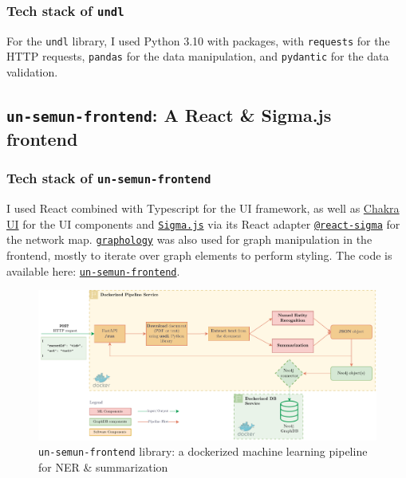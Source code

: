 \documentclass[11pt]{article}
\begin{document}
\subsubsection*{Tech stack of \texttt{undl}} \label{sssec:tech-stack-of-undl}

For the \texttt{undl} library, I used Python 3.10 with packages, with \texttt{requests} for the HTTP requests, \texttt{pandas} for the data manipulation, and \texttt{pydantic} for the data validation.

\subsection{\texttt{un-semun-frontend}: A React \& Sigma.js frontend} \label{ssec:un-semun-frontend-a-react-sigma-js-frontend}
\subsubsection*{Tech stack of \texttt{un-semun-frontend}} \label{sssec:tech-stack-of-un-semun-frontend}

I used React combined with Typescript for the UI framework, as well as \href{https://chakra-ui.com/}{Chakra UI} for the UI components and \href{https://www.sigmajs.org/}{\texttt{Sigma.js}} via its React adapter \href{https://sim51.github.io/react-sigma/}{\texttt{@react-sigma}} for the network map. \href{https://graphology.github.io/}{\texttt{graphology}} was also used for graph manipulation in the frontend, mostly to iterate over graph elements to perform styling. The code is available here: \href{https://github.com/ClementSicard/un-semun-frontend}{\faGithub{} \texttt{un-semun-frontend}}.



\begin{figure}[!htb]
    \centering

    \includegraphics[width=\textwidth]{res/ml-pipeline.pdf}
    \caption{\texttt{un-semun-frontend} library: a dockerized machine learning pipeline for NER \& summarization}

    \label{fig:frontend-screenshot}
\end{figure}
\end{document}
